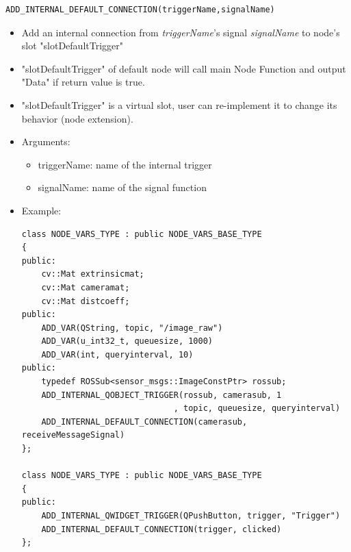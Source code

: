 \documentclass[a4paper,10pt]{book}
\begin{document}
\begin{mdframed}
\begin{verbatim}
ADD_INTERNAL_DEFAULT_CONNECTION(triggerName,signalName)
\end{verbatim}
\begin{itemize}
 \item Add an internal connection from {\em{triggerName}}'s signal {\em{signalName}} to node's slot "slotDefaultTrigger"
 \item "slotDefaultTrigger" of default node will call main Node Function and output "Data" if return value is true.
 \item "slotDefaultTrigger" is a virtual slot, user can re-implement it to change its behavior (node extension).
 \item Arguments:
 \begin{itemize}
  \item triggerName: name of the internal trigger
  \item signalName: name of the signal function
 \end{itemize}
 \item Example:
 \begin{verbatim}
class NODE_VARS_TYPE : public NODE_VARS_BASE_TYPE
{
public:
    cv::Mat extrinsicmat;
    cv::Mat cameramat;
    cv::Mat distcoeff;
public:
    ADD_VAR(QString, topic, "/image_raw")
    ADD_VAR(u_int32_t, queuesize, 1000)
    ADD_VAR(int, queryinterval, 10)
public:
    typedef ROSSub<sensor_msgs::ImageConstPtr> rossub;
    ADD_INTERNAL_QOBJECT_TRIGGER(rossub, camerasub, 1
                               , topic, queuesize, queryinterval)
    ADD_INTERNAL_DEFAULT_CONNECTION(camerasub, receiveMessageSignal)
};

class NODE_VARS_TYPE : public NODE_VARS_BASE_TYPE
{
public:
    ADD_INTERNAL_QWIDGET_TRIGGER(QPushButton, trigger, "Trigger")
    ADD_INTERNAL_DEFAULT_CONNECTION(trigger, clicked)
};
 \end{verbatim}
\end{itemize}
\end{mdframed}
\end{document}
